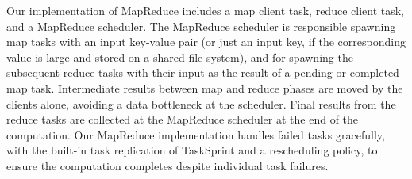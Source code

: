 \documentclass [11pt, twocolumn] {article}
\begin{document}
Our implementation of MapReduce includes a map client task, reduce client task, and a MapReduce scheduler. The MapReduce scheduler is responsible spawning map tasks with an input key-value pair (or just an input key, if the corresponding value is large and stored on a shared file system), and for spawning the subsequent reduce tasks with their input as the result of a pending or completed map task. Intermediate results between map and reduce phases are moved by the clients alone, avoiding a data bottleneck at the scheduler. Final results from the reduce tasks are collected at the MapReduce scheduler at the end of the computation. Our MapReduce implementation handles failed tasks gracefully, with the built-in task replication of TaskSprint and a rescheduling policy, to ensure the computation completes despite individual task failures.
\end{document}
